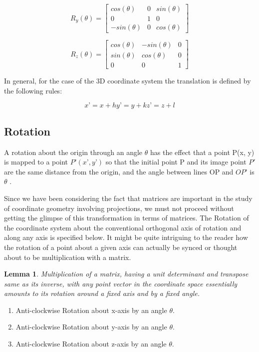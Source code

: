 \documentclass[12pt]{report}
\newtheorem{lemma}[theorem]{Lemma}
\begin{document}
\[ R_{y}(\theta) = \begin{bmatrix}
cos(\theta) & 0 & sin(\theta) \\
0 & 1 & 0 \\
-sin(\theta) & 0 & cos(\theta) 
\end{bmatrix} \]


\[ R_{z}(\theta) = \begin{bmatrix}
cos(\theta) & -sin(\theta) & 0 \\
sin(\theta) & cos(\theta) & 0 \\
0 & 0 & 1 
\end{bmatrix} \]

In general, for the case of the 3D coordinate system the translation is defined by the following rules:

\[ 		x’ = x + h	y’ = y + k	z’ = z + l  \]

\subsection{Rotation}

A rotation about the origin through an angle $ \theta$ has the effect that a point P(x, y) is mapped to a point $ P’ (x’ , y’) $ so that the initial point P and its image point $ P' $ are the same distance from the origin, and the angle between lines OP and $ OP’ $ is $ \theta $ .
\vspace{0.3cm}

\hspace{1cm} Since we have been considering the fact that matrices are important in the study of coordinate geometry involving projections, we must not proceed without getting the glimpse of this transformation in terms of matrices. The Rotation of the coordinate system about the conventional orthogonal axis of rotation and along any axis is specified below.
\vspace{0.3cm}
It might be quite intriguing to the reader how the rotation of a point about a given axis can actually be synced or thought about to be multiplication with a matrix. 

\begin{lemma}
  Multiplication of a matrix, having a unit determinant and transpose same as its inverse, with any point vector in the coordinate space essentially amounts to its rotation around a fixed axis and by a fixed angle.
\end{lemma}

\begin{enumerate}
  \item Anti-clockwise Rotation about x-axis by an angle $\theta$.
  \item Anti-clockwise Rotation about y-axis by an angle $\theta$. 
  \item Anti-clockwise Rotation about z-axis by an angle $\theta$. 
\end{enumerate}
\end{document}
